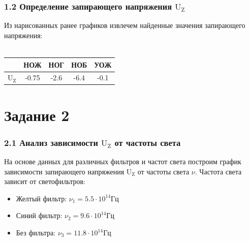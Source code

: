 \documentclass[12pt,openany]{book}
\begin{document}
\newpage

\subsection*{1.2 Определение запирающего напряжения $\text{U}_\text{Z}$}

\vspace{10pt}

\noindent Из нарисованных ранее графиков извлечем найденные значения
запирающего напряжения:\\\\

\begin{center}
    \begin{tabular}{|c|c|c|c|c|}
        \hline
        & НОЖ & НОГ & НОБ & УОЖ \\
        \hline
        $\text{U}_\text{Z}$ & -0.75 & -2.6 & -6.4 & -0.1 \\
        \hline
    \end{tabular}
\end{center}

\chapter*{Задание 2}

\subsection*{2.1  Анализ зависимости $\text{U}_\text{Z}$ от частоты света}

\vspace{10pt}

\noindent На основе данных для различных фильтров и 
частот света построим график зависимости запирающего напряжения 
$\text{U}_\text{Z}$ от частоты света $\nu$. 
Частота света зависит от светофильтров:\\

{
    \begin{itemize}[noitemsep]
        \item Желтый фильтр: $\nu_1 = 5.5 \cdot 10^{14} \text{Гц}$
        \item Синий фильтр: $\nu_2 = 9.6 \cdot 10^{14} \text{Гц}$
        \item Без фильтра: $\nu_3 = 11.8 \cdot 10^{14} \text{Гц}$
    \end{itemize}
}

\vspace{2pt}
\end{document}
